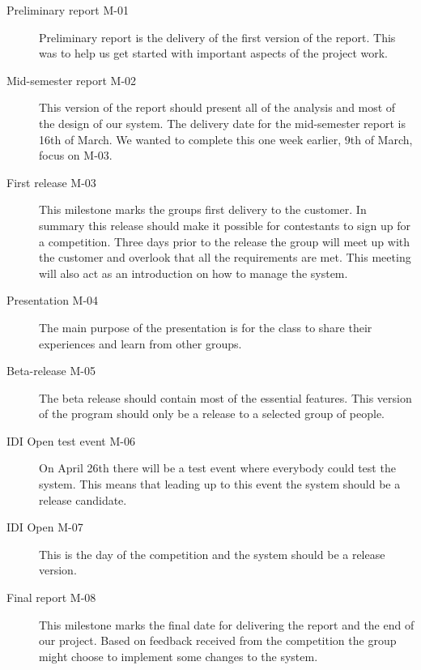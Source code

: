 \begin{description}
    \item[Preliminary report M-01]
    Preliminary report is the delivery of the first version of the report.
    This was to help us get started with important aspects of the project work.

    \item[Mid-semester report M-02]
    This version of the report should present all of the analysis and most of
    the design of our system. The delivery date for the mid-semester report
    is 16th of March. We wanted to complete this one week earlier, 9th of March,
    focus on M-03.

    \item[First release M-03]
    This milestone marks the groups first delivery to the customer. In summary
    this release should make it possible for contestants to sign up for a
    competition. Three days prior to the release the group will meet up with
    the customer and overlook that all the requirements are met. This meeting
    will also act as an introduction on how to manage the system.

    \item[Presentation M-04]
    The main purpose of the presentation is for the class to share their
    experiences and learn from other groups. 

    \item[Beta-release M-05]
    The beta release should contain most of the essential features. This
    version of the program should only be a release to a selected group of
    people. 

    \item[IDI Open test event M-06]
    On April 26th there will be a test event where everybody could test the
    system. This means that leading up to this event the system should be a
    release candidate. 

    \item[IDI Open M-07]
    This is the day of the competition and the system should be a release
    version. 

    \item[Final report M-08]
    This milestone marks the final date for delivering the report and the end
    of our project. Based on feedback received from the competition the group
    might choose to implement some changes to the system. 
\end{description}

